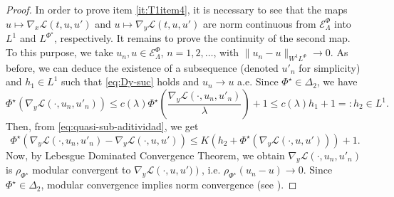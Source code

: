 \documentclass[twoside]{article}
\theoremstyle{remark}
\newcommand{\lphi}{L^{\Phi}}
\newcommand{\lpsi}{L^{\Phi^{\star}}}
\newcommand{\sobnor}{\|_{W^{1}\lphi}}
\newcommand{\domi}{\mathcal{E}^{\Phi}}
\renewcommand{\leq}{\leqslant}
\begin{document}
\begin{proof}
In order to prove item  \ref{it:T1item4}, it is necessary to see that the maps \linebreak[4]$u\mapsto \nabla_x\mathcal{L}(t,u,u')$  
and $u\mapsto \nabla_y\mathcal{L}(t,u,u')$  are norm continuous
from $\domi_{\Lambda} $ into $L^1$ and
 $\lpsi$, respectively.  
It remains to prove the continuity of the second map. 
To this purpose, we take  $u_n, u \in \domi_{\Lambda}$, $n=1,2,\dots$, with $\|u_n- u\sobnor\to 0$.  
As before, we can deduce the existence of a subsequence (denoted $u'_n$ for simplicity) and $h_1 \in L^1$ such that \eqref{eq:Dy-suc} holds and $u_n \to u$ a.e.
 Since $\Phi^{\star}\in\Delta_2$, we have 
\begin{equation}
\Phi^{\star}(\nabla_y \mathcal{L}(\cdot,u_n,u'_n))\leq c(\lambda) \Phi^{\star}\left(\frac{\nabla_y \mathcal{L}(\cdot,u_n,u'_n)}{\lambda}\right)+1\leq c(\lambda)h_1+1=:h_2\in L^1.
\end{equation} 
Then, from \ref{eq:quasi-sub-aditividad}, we get
\[\Phi^{\star}\left(\nabla_y \mathcal{L}(\cdot,u_n,u'_n)-
\nabla_y \mathcal{L}(\cdot,u,u')\right)\leq K (h_2+\Phi^{\star}(\nabla_y \mathcal{L}(\cdot,u,u')))+1.\]
Now, by Lebesgue Dominated Convergence Theorem, we obtain 
$\nabla_y \mathcal{L}(\cdot,u_n,u'_n)$ is $\rho_{\Phi^{\star}}$ modular convergent to $\nabla_y \mathcal{L}\left(\cdot,u,u')\right)$, i.e.
$\rho_{\Phi^{\star}}(u_n-u)\to 0$. 
Since $\Phi^{\star} \in \Delta_2$, modular convergence implies norm convergence (see \cite{Skaff1969}).
\end{proof}
\end{document}
